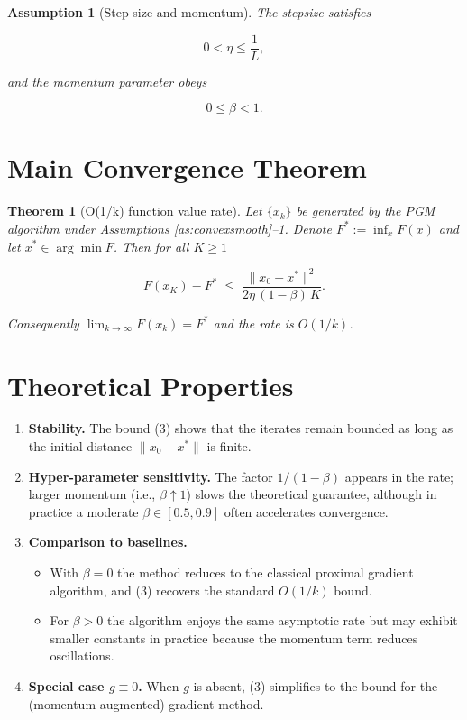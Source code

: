 \documentclass{article}
\newtheorem{theorem}{Theorem}
\newtheorem{assumption}{Assumption}
\begin{document}
\begin{assumption}[Step size and momentum]\label{as:params}
The stepsize satisfies  

\[
0<\eta\le \frac{1}{L},
\]

and the momentum parameter obeys  

\[
0\le\beta<1.
\]
\end{assumption}

\section*{Main Convergence Theorem}
\begin{theorem}[O(1/k) function value rate]\label{thm:rate}
Let $\{x_{k}\}$ be generated by the PGM algorithm under Assumptions \ref{as:convexsmooth}–\ref{as:params}.  
Denote $F^{*}:=\inf_{x}F(x)$ and let $x^{*}\in\arg\min F$. Then for all $K\ge 1$

\[
F(x_{K})-F^{*}\;\le\;\frac{\|x_{0}-x^{*}\|^{2}}{2\eta\,(1-\beta)\,K}.
\tag{3}
\]

Consequently $\displaystyle\lim_{k\to\infty}F(x_{k})=F^{*}$ and the rate is $O(1/k)$.
\end{theorem}

\section*{Theoretical Properties}
\begin{enumerate}[label=\arabic*.]
\item \textbf{Stability.} The bound (3) shows that the iterates remain bounded as long as the initial distance $\|x_{0}-x^{*}\|$ is finite.
\item \textbf{Hyper‑parameter sensitivity.} The factor $1/(1-\beta)$ appears in the rate; larger momentum (i.e., $\beta\!\uparrow\!1$) slows the theoretical guarantee, although in practice a moderate $\beta\in[0.5,0.9]$ often accelerates convergence.
\item \textbf{Comparison to baselines.}
\begin{itemize}
\item With $\beta=0$ the method reduces to the classical proximal gradient algorithm, and (3) recovers the standard $O(1/k)$ bound.
\item For $\beta>0$ the algorithm enjoys the same asymptotic rate but may exhibit smaller constants in practice because the momentum term reduces oscillations.
\end{itemize}
\item \textbf{Special case $g\equiv0$.} When $g$ is absent, (3) simplifies to the bound for the (momentum‑augmented) gradient method.
\end{enumerate}
\end{document}
